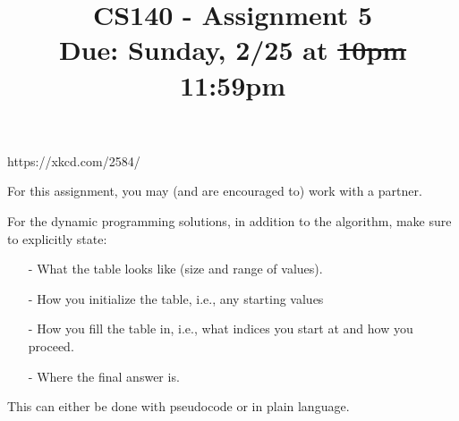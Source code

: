 \documentclass[11pt]{article}
\title{CS140 - Assignment 5\\\small{Due: Sunday,  2/25 at \sout{10pm} 11:59pm}}
\author{}
\date{}
\begin{document}
\maketitle

\begin{center}

\footnotesize{https://xkcd.com/2584/}
\end{center}

\noindent For this assignment, you may (and are encouraged to) work with a partner.

\noindent For the dynamic programming solutions, in addition to the algorithm, make sure to explicitly state:

\begin{itemize}

\item[-] What the table looks like (size and range of values).

\item[-] How you initialize the table, i.e., any starting values

\item[-] How you fill the table in, i.e., what indices you start at and how you proceed.

\item[-] Where the final answer is.

\end{itemize}

\noindent This can either be done with pseudocode or in plain language.
\end{document}
